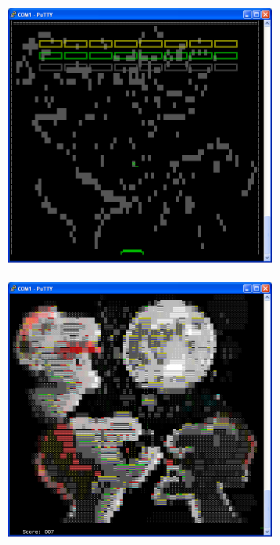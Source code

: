 \begin{figure}
\begin{subfigure}[c]{\columnwidth}
\begin{subfigure}{0.3\linewidth}
		\end{subfigure}
	\end{subfigure}
	\begin{subfigure}[b]{\columnwidth}
		\center
		\begin{subfigure}{0.3\linewidth}
			\includegraphics[scale=0.3]{pictures/level_4.PNG}
		\end{subfigure}
		\begin{subfigure}{0.3\linewidth}
			\includegraphics[scale=0.3]{pictures/level_4_complete.PNG}

\end{subfigure}
\end{subfigure}
\end{figure}
